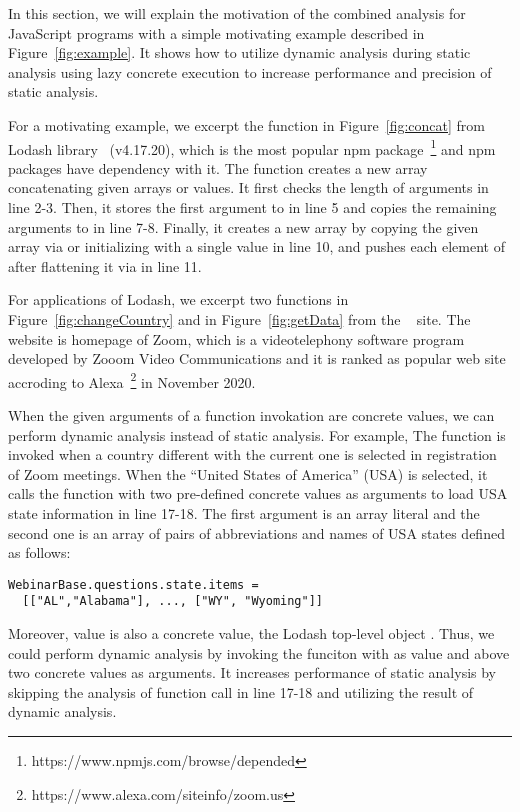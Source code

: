 In this section, we will explain the motivation of the combined analysis for
JavaScript programs with a simple motivating example described in
Figure~\ref{fig:example}.  It shows how to utilize dynamic analysis during
static analysis using lazy concrete execution to increase performance and
precision of static analysis.

For a motivating example, we excerpt the  function in
Figure~\ref{fig:concat} from Lodash library~\cite{lodash} (v4.17.20), which is
the most popular npm package~\footnote{https://www.npmjs.com/browse/depended}
and  npm packages have dependency with it.  The 
function creates a new array concatenating given arrays or values.  It first
checks the length of arguments in line 2-3. Then, it stores the first argument
to  in line 5 and copies the remaining arguments to  in
line 7-8.  Finally, it creates a new array by copying the given array via
 or initializing with a single value in line 10, and pushes
each element of  after flattening it via  in
line 11.

For applications of Lodash, we excerpt two functions  in
Figure~\ref{fig:changeCountry} and  in Figure~\ref{fig:getData}
from the ~\cite{zoom} site.  The website  is
homepage of Zoom, which is a videotelephony software program developed by Zooom
Video Communications and it is ranked as  popular web site accroding
to Alexa~\footnote{https://www.alexa.com/siteinfo/zoom.us} in November 2020.

When the given arguments of a function invokation are concrete values, we can
perform dynamic analysis instead of static analysis. For example, The
 function is invoked when a country different with the
current one is selected in registration of Zoom meetings.  When the ``United
States of America'' (USA) is selected, it calls the  function
with two pre-defined concrete values as arguments to load USA state information
in line 17-18.  The first argument is an array literal  and the second one is an array of pairs of abbreviations and names of
USA states defined as follows:
\begin{lstlisting}[style=myJSstyle,numbers=none]
WebinarBase.questions.state.items =
  [["AL","Alabama"], ..., ["WY", "Wyoming"]]
\end{lstlisting}
Moreover,  value is also a concrete value, the Lodash top-level
object \jscode{\_}.  Thus, we could perform dynamic analysis by invoking the
 funciton with \jscode{\_} as  value and above two
concrete values as arguments.  It increases performance of static analysis by
skipping the analysis of function call in line 17-18 and utilizing the result of
dynamic analysis.


